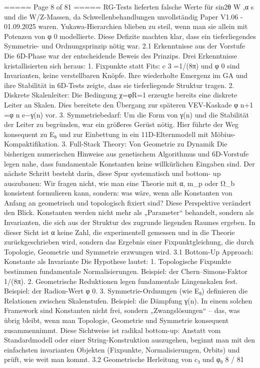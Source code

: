 \begin{MyVerbatim}
===== Page 8 of 81 =====
RG-Tests lieferten falsche Werte für sin2θ W ,α s und die W/Z-Massen, da Schwellenbehandlungen unvollständig
Paper V1.06 - 01.09.2025
waren.
Yukawa-Hierarchien blieben zu steil, wenn man sie allein mit Potenzen von φ 0 modellierte.
Diese Defizite machten klar, dass ein tieferliegendes Symmetrie- und Ordnungsprinzip nötig war.
2.1 Erkenntnisse aus der Vorstufe
Die 6D-Phase war der entscheidende Beweis des Prinzips. Drei Erkenntnisse kristallisierten sich heraus:
1. Fixpunkte statt Fits:
c 3 =1/(8π) und φ 0 sind Invarianten, keine verstellbaren Knöpfe. Ihre wiederholte Emergenz im GA und ihre Stabilität
in 6D-Tests zeigte, dass sie tieferliegende Struktur tragen.
2. Diskrete Skalenleiter:
Die Bedingung χ=φR=1 erzeugte bereits eine diskrete Leiter an Skalen. Dies bereitete den Übergang zur
späteren VEV-Kaskade φ n+1 =φ n e−γ(n) vor.
3. Symmetriebedarf:
Um die Form von γ(n) und die Stabilität der Leiter zu begründen, war ein größeres Gerüst nötig. Hier führte der Weg
konsequent zu E₈ und zur Einbettung in ein 11D-Elternmodell mit Möbius-Kompaktifikation.
3. Full-Stack Theory: Von Geometrie zu Dynamik
Die bisherigen numerischen Hinweise aus genetischem Algorithmus und 6D-Vorstufe legen nahe, dass fundamentale
Konstanten keine willkürlichen Eingaben sind. Der nächste Schritt besteht darin, diese Spur systematisch und bottom-
up auszubauen: Wir fragen nicht, wie man eine Theorie mit α, m_p oder Ω_b konsistent formulieren kann, sondern: was
wäre, wenn alle Konstanten von Anfang an geometrisch und topologisch fixiert sind?
Diese Perspektive verändert den Blick. Konstanten werden nicht mehr als „Parameter“ behandelt, sondern als
Invarianten, die sich aus der Struktur des zugrunde liegenden Raumes ergeben. In dieser Sicht ist α keine Zahl, die
experimentell gemessen und in die Theorie zurückgeschrieben wird, sondern das Ergebnis einer Fixpunktgleichung,
die durch Topologie, Geometrie und Symmetrie erzwungen wird.
3.1 Bottom-Up Approach: Konstante als Invariante
Die Hypothese lautet:
1. Topologische Fixpunkte bestimmen fundamentale Normalisierungen. Beispiel: der Chern–Simons-Faktor 1/(8π).
2. Geometrische Reduktionen legen fundamentale Längenskalen fest. Beispiel: der Radion-Wert φ 0.
3. Symmetrie-Ordnungen (wie E₈) definieren die Relationen zwischen Skalenstufen. Beispiel: die Dämpfung γ(n).
In einem solchen Framework sind Konstanten nicht frei, sondern „Zwangslösungen“ – das, was übrig bleibt, wenn man
Topologie, Geometrie und Symmetrie konsequent zusammennimmt.
Diese Sichtweise ist radikal bottom-up: Anstatt vom Standardmodell oder einer String-Konstruktion auszugehen, beginnt
man mit den einfachsten invarianten Objekten (Fixpunkte, Normalisierungen, Orbits) und prüft, wie weit man kommt.
3.2 Geometrische Herleitung von c₃ und φ₀
8 / 81


\end{MyVerbatim}
